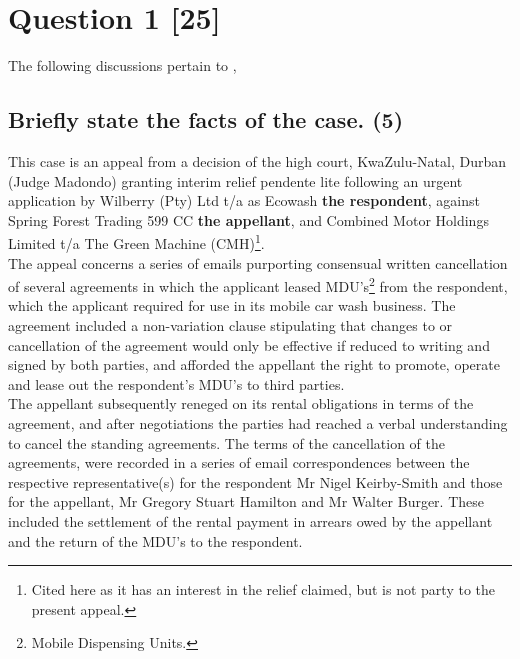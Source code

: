 \documentclass[11pt]{article}
\begin{document}
\section{Question 1 [25]}
\label{sec:org33e40d2}
\cite{papadopoulus12_intro_cyberlaw,buys00_towards_ecomm_policy_sa,hamann14_direct_marketing_and_spam_via_ecomms,eiselen16_ecomm,gereda16_elec_comms_trans_act,pistorius16_copyright_law_it,pistorius16_domain_names_infringe_tm,un96_uncitral_model_law_ecomm,comesa10_model_law_on_e_trans,rsa00_green_paper_ecomm_sa,hipssa13_elec_trans_ecom_sadc_model_law,rsa12_elect_comm_trans_amend_bill,rsa12_ect_adr,rsa02_elect_comm_trans_act}

The following discussions pertain to 
\cite{Cachalia15_spring_forest_v_wilberry},

\subsection{Briefly state the facts of the case. (5)}
\label{sec:org5a2b872}

This case is an appeal from a decision of the high court, KwaZulu-Natal, Durban
(Judge Madondo) granting interim relief pendente lite following an urgent
application by Wilberry (Pty) Ltd t/a as Ecowash \textbf{the respondent}, against Spring
Forest Trading 599 CC \textbf{the appellant}, and Combined Motor Holdings Limited t/a
The Green Machine (CMH)\footnote{Cited here as it has an interest in the relief
claimed, but is not party to the present appeal.}.\\

The appeal concerns a series of emails purporting consensual written
cancellation of several agreements in which the applicant leased
MDU's\footnote{Mobile Dispensing Units.} from the respondent, which the applicant
required for use in its mobile car wash business. The agreement included a
non-variation clause stipulating that changes to or cancellation of the
agreement would only be effective if reduced to writing and signed by both
parties, and afforded the appellant the right to promote, operate and lease out
the respondent's MDU's to third parties.\\

The appellant subsequently reneged on its rental obligations in terms of the
agreement, and after negotiations the parties had reached a verbal understanding
to cancel the standing agreements. The terms of the cancellation of the
agreements, were recorded in a series of email correspondences between the
respective representative(s) for the respondent Mr Nigel Keirby-Smith and those
for the appellant, Mr Gregory Stuart Hamilton and Mr Walter Burger. These
included the settlement of the rental payment in arrears owed by the appellant
and the return of the MDU's to the respondent.
\end{document}
